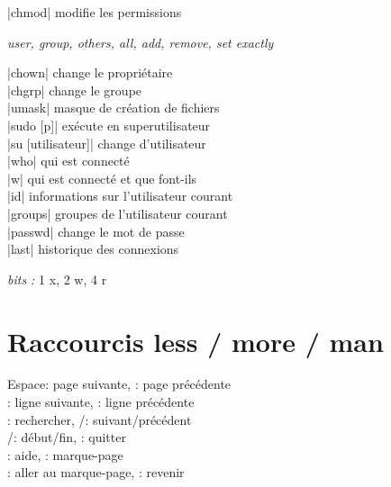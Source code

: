 \documentclass[9pt]{extarticle}
\newcommand{\lstcode}[1]{\inlinecode{\detokenize{#1}}}
\let\oldkeys\keys
\renewcommand{\keys}[1]{\footnotesize\oldkeys{#1}\normalsize}
\newenvironment{cmdblock}{%
  \par\setlength{\parindent}{0pt}\setlength{\parskip}{0pt}%
}{\par}
\newlength{\cmdoptindent}
\newcommand{\cmdopt}[1]{%
  \hspace*{\cmdoptindent}%
  \begin{minipage}[t]{\dimexpr\linewidth-\cmdoptindent\relax}
    \RaggedRight \itshape #1%
  \end{minipage}\par
}
\begin{document}
\begin{multicols}{4}
\begin{cmdblock}
\code|chmod| \quad modifie les permissions \\
\cmdopt{\lstcode{u} user, \lstcode{g} group, \lstcode{o} others, \lstcode{a} all,
        \lstcode{+} add, \lstcode{-} remove, \lstcode{=} set exactly}
\code|chown| \quad change le propriétaire \\
\code|chgrp| \quad change le groupe \\
\code|umask| \quad masque de création de fichiers \\
\code|sudo [p]| \quad exécute en superutilisateur \\
\code|su [utilisateur]| \quad change d'utilisateur \\
\code|who| \quad qui est connecté \\
\code|w| \quad qui est connecté et que font-ils \\
\code|id| \quad informations sur l'utilisateur courant \\
\code|groups| \quad groupes de l'utilisateur courant \\
\code|passwd| \quad change le mot de passe \\
\code|last| \quad historique des connexions \\
\end{cmdblock}

\textit{bits :} 1 x, 2 w, 4 r \\

\section*{Raccourcis less / more / man}
Espace: page suivante, : page précédente \\
\keys{\return}{}: ligne suivante, : ligne précédente \\
\keys{/}: rechercher, /: suivant/précédent \\
/: début/fin, : quitter \\
: aide, : marque-page \\
: aller au marque-page, : revenir \\



\end{multicols}
\end{document}
